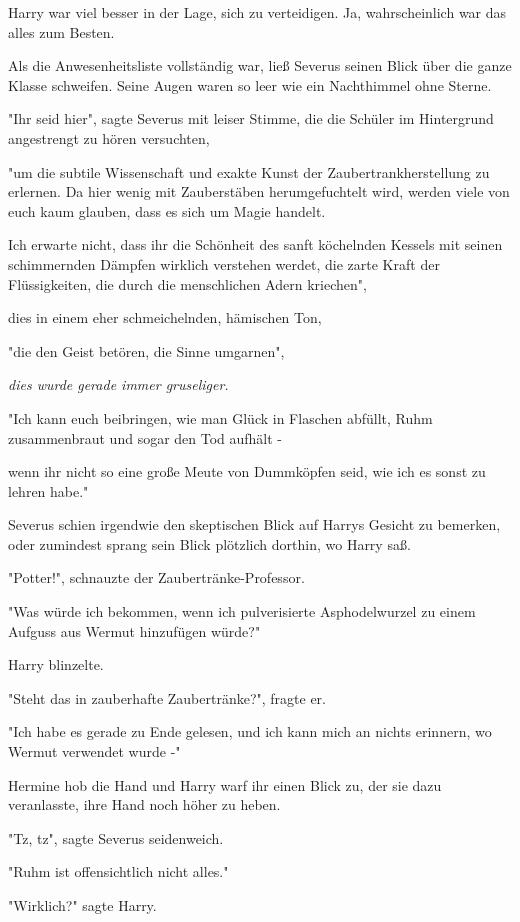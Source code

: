 {Harry war viel besser in der Lage, sich zu verteidigen. Ja, wahrscheinlich war das alles zum Besten.

Als die Anwesenheitsliste vollständig war, ließ Severus seinen Blick über die ganze Klasse schweifen. Seine Augen waren so leer wie ein Nachthimmel ohne Sterne.

"Ihr seid hier", sagte Severus mit leiser Stimme, die die Schüler im Hintergrund angestrengt zu hören versuchten,

"um die subtile Wissenschaft und exakte Kunst der Zaubertrankherstellung zu erlernen. Da hier wenig mit Zauberstäben herumgefuchtelt wird, werden viele von euch kaum glauben, dass es sich um Magie handelt.

Ich erwarte nicht, dass ihr die Schönheit des sanft köchelnden Kessels mit seinen schimmernden Dämpfen wirklich verstehen werdet, die zarte Kraft der Flüssigkeiten, die durch die menschlichen Adern kriechen",

dies in einem eher schmeichelnden, hämischen Ton,

"die den Geist betören, die Sinne umgarnen",

\emph{dies wurde gerade immer gruseliger.}

"Ich kann euch beibringen, wie man Glück in Flaschen abfüllt, Ruhm zusammenbraut und sogar den Tod aufhält -

wenn ihr nicht so eine große Meute von Dummköpfen seid, wie ich es sonst zu lehren habe."

Severus schien irgendwie den skeptischen Blick auf Harrys Gesicht zu bemerken, oder zumindest sprang sein Blick plötzlich dorthin, wo Harry saß.

"Potter!", schnauzte der Zaubertränke-Professor.

"Was würde ich bekommen, wenn ich pulverisierte Asphodelwurzel zu einem Aufguss aus Wermut hinzufügen würde?"

Harry blinzelte.

"Steht das in zauberhafte Zaubertränke?", fragte er.

"Ich habe es gerade zu Ende gelesen, und ich kann mich an nichts erinnern, wo Wermut verwendet wurde -"

Hermine hob die Hand und Harry warf ihr einen Blick zu, der sie dazu veranlasste, ihre Hand noch höher zu heben.

"Tz, tz", sagte Severus seidenweich.

"Ruhm ist offensichtlich nicht alles."

"Wirklich?" sagte Harry.

}
